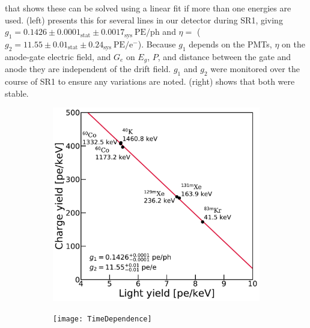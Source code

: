 {\noindent that shows these can be solved using a linear fit if more than one energies are
used.   (left) presents this for several lines in our detector during SR1, giving
$g_1 = 0.1426 \pm 0.0001_{\mathrm{stat}} \pm 0.0017_{\mathrm{sys}}\ \mathrm{PE/ph}$ and $\eta = $
($g_2 = 11.55 \pm 0.01_{\mathrm{stat}} \pm 0.24_{\mathrm{sys}}\ \mathrm{PE/e^-}$).  Because $g_1$ depends on the PMTs, $\eta$ on the anode-gate electric field, and $G_e$ on
$E_g$, $P$, and distance between the gate and anode they are independent of the drift field.  $g_1$ and $g_2$ were monitored over the
course of SR1 to ensure any variations are noted.   (right) shows that both
were stable.

\begin{figure}
    \centering
    \begin{subfigure}[t]{0.45\textwidth}
        \centering
        \includegraphics[width=\textwidth]{g1g2Anticorrelation}
    \end{subfigure}%
    \begin{subfigure}[t]{0.45\textwidth}
        \centering
        \texttt{[image: TimeDependence]}
    \end{subfigure}
    \caption{}
	\label{fig:calibrations_photon_charge_efficiences_g1_g2}
\end{figure}

}
